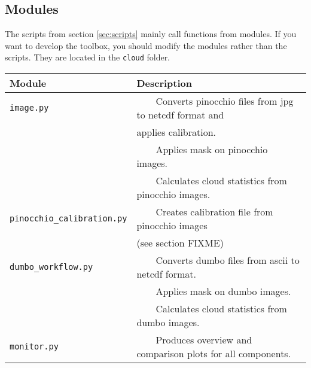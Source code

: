 \documentclass[11pt,a4paper]{article}
\newcommand{\tabitem}{~~\llap{\textbullet}~~}
\begin{document}
\subsection{Modules}
The scripts from section \ref{sec:scripts} mainly call functions from modules. If you want to develop the \cloud toolbox, you should modify the modules rather than the scripts. They are located in the \texttt{cloud} folder.
\begin{table}[h!]
	\centering
	\begin{tabular}{|l|l|}
	\hline 
	\textbf{Module} & \textbf{Description}\\ 
	\hline \hline 
	\texttt{image.py} & \tabitem Converts pinocchio files from jpg to netcdf format and\\ 
	& applies calibration.\\
	& \tabitem Applies mask on pinocchio images.\\
	& \tabitem Calculates cloud statistics from pinocchio images.\\ 
	\hline 
	\texttt{pinocchio\_calibration.py} &  \tabitem Creates calibration file from pinocchio images \\
	& (see section FIXME)\\ 
	\hline 
	\texttt{dumbo\_workflow.py} & \tabitem Converts dumbo files from ascii to netcdf format.\\
	& \tabitem Applies mask on dumbo images.\\
	& \tabitem Calculates cloud statistics from dumbo images.\\ 
	\hline 
	\texttt{monitor.py} & \tabitem Produces overview and comparison plots for all components.\\ 
	\hline 
	\end{tabular} 
\end{table}
\end{document}
